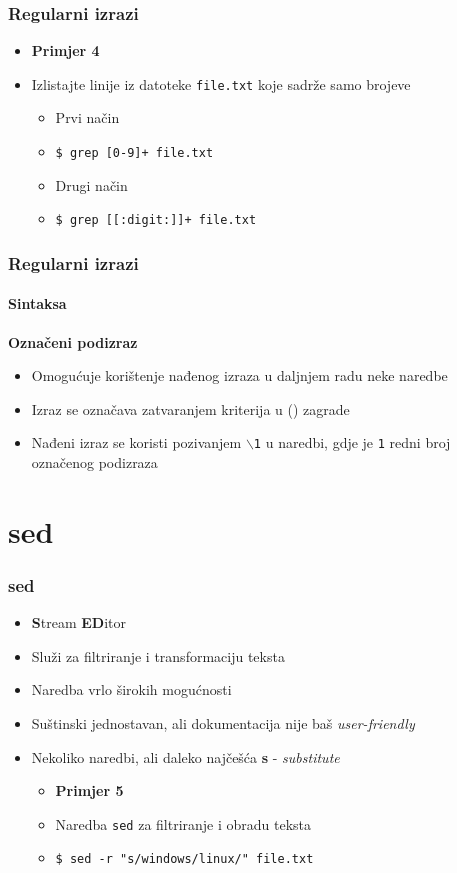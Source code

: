 \documentclass[table,usenames,dvipsnames]{beamer}
\newcommand{\shell}[1]{\texttt{#1}}
\begin{document}
\begin{frame}[t]
\frametitle{Regularni izrazi}
\begin{itemize}
\item \textbf{Primjer 4}
\item[] Izlistajte linije iz datoteke \shell{file.txt} koje sadrže samo brojeve
\begin{itemize}
	\item Prvi način
	\item[] \shell{\$ grep [0-9]+ file.txt}
	\item Drugi način
	\item[] \shell{\$ grep [[:digit:]]+ file.txt}
\end{itemize}
\end{itemize}
\end{frame}

\begin{frame}[fragile]
\frametitle{Regularni izrazi}
\framesubtitle{Sintaksa}
\textbf{Označeni podizraz}
\begin{itemize}
	\item Omogućuje korištenje nađenog izraza u daljnjem radu neke naredbe
	\item Izraz se označava zatvaranjem kriterija u () zagrade
	\item Nađeni izraz se koristi pozivanjem \shell{$\backslash$1} u naredbi, gdje je \shell{1} redni broj označenog podizraza
\end{itemize}
\vfill
\vfill
\end{frame}

\section{sed}

\begin{frame}
\frametitle{sed}
\begin{itemize}
	\item \textbf{S}tream \textbf{ED}itor
	\item Služi za filtriranje i transformaciju teksta
	\item Naredba vrlo širokih mogućnosti
	\item Suštinski jednostavan, ali dokumentacija nije baš \textit{user-friendly}
	\item Nekoliko naredbi, ali daleko najčešća \textbf{s} - \textit{substitute}

	\begin{itemize}
		\item \textbf{Primjer 5}
		\item[] Naredba \shell{sed} za filtriranje i obradu teksta
		\item \small \shell{\$ sed -r "s/windows/linux/" file.txt}
	\end{itemize}
\end{itemize}
\end{frame}
\end{document}
